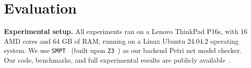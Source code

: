 \section{Evaluation}
\label{sec:evaluation}



\noindent
\textbf{Experimental setup.}
All experiments ran on a Lenovo ThinkPad P16s, with 16 AMD cores and 64 GB of RAM, running on a Linux Ubuntu 24.04.2 operating system.
%
%
We use \texttt{SMPT}~\cite{AmDa23} (built upon \texttt{Z3}~\cite{DeBj08}) as our backend Petri net model checker.
Our code, benchmarks, and full experimental results are publicly available~\cite{ArtifactRepository}.



